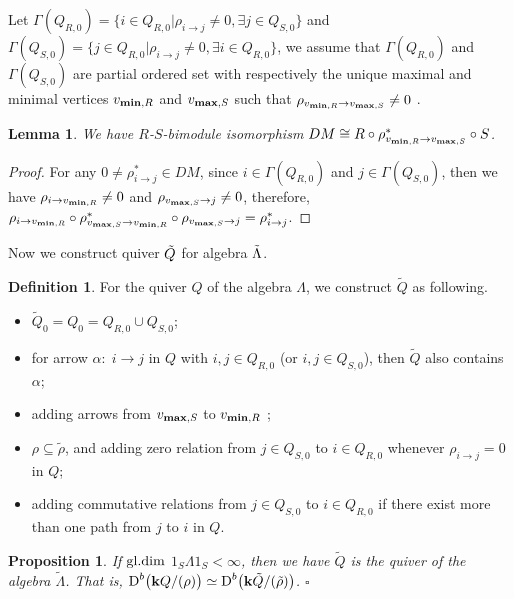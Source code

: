 \documentclass[a4paper, reqno]{amsart}
\newtheorem{lem}[thm]{Lemma}
\newtheorem{prop}[thm]{Proposition}
\theoremstyle{definition}
\newtheorem{defn}[thm]{Definition}
\theoremstyle{remark}
\numberwithin{equation}{section}
\begin{document}
 Let $\Gamma(Q_{R,0}) = \{i\in  Q_{R,0}|\rho_{i\to j}\neq 0, \exists j \in Q_{S,0}\} $ and $\Gamma(Q_{S,0}) = \{j\in  Q_{R,0}|\rho_{i\to j}\neq 0, \exists i \in Q_{R,0}\} $, we assume that $\Gamma(Q_{R,0})$ and $\Gamma(Q_{S,0})$ are partial ordered set with respectively the unique maximal and minimal vertices $ v_{{\bf min},R}$ and $ v_{{\bf max},S}$ such that $ \rho_{ v_{{\bf min},R}\to v_{{\bf max},S} }\neq 0$ . 

 \begin{lem}
     We have $R$-$S$-bimodule isomorphism $ DM \cong R\circ \rho_{ v_{{\bf min},R}\to v_{{\bf max},S} }^{*} \circ S $.
 \end{lem}

 \begin{proof}
     For any $0\neq \rho_{i\to j}^{*}\in DM$, since $i\in \Gamma(Q_{R,0})$ and $j\in \Gamma(Q_{S,0})$, then we have $ \rho_{i\to v_{{\bf min},R}} \neq 0$ and $ \rho_{ v_{{\bf max},S}\to j} \neq 0$, therefore, $ \rho_{i\to v_{{\bf min},R}} \circ \rho_{v_{{\bf max},S}\to v_{{\bf min},R}}^{*} \circ \rho_{ v_{{\bf max},S}\to j} = \rho_{i\to j}^{*} $.
 \end{proof}
 
 
 Now we construct quiver $\Tilde{Q}$ for algebra $\Tilde{\Lambda}$. 

 \begin{defn}\label{tildeQ}
For the quiver $Q$ of the algebra $\Lambda$, we construct $\tilde{Q}$ as following.
\begin{itemize}
    \item $\tilde{Q}_0=Q_0=Q_{R,0}\cup Q_{S,0}$;
    \item for arrow $\alpha:\;i\rightarrow j$ in $Q$ with $i,j\in Q_{R,0}$ (or $i,j\in Q_{S,0}$), then $\tilde{Q}$ also contains $\alpha$;
    \item adding arrows from $ v_{{\bf max},S}$ to $v_{{\bf min},R}$ ;
    \item $\rho\subseteq \tilde{\rho}$, and adding zero relation from $j\in Q_{S,0}$ to $i\in Q_{R,0}$ whenever $\rho_{i\to j} =0$ in $Q$;
    \item adding commutative relations from $j\in Q_{S,0}$ to $i\in Q_{R,0}$ if there exist more than one path from $j$ to $i$ in $Q$.
\end{itemize}
\end{defn}

\begin{prop}\label{DerInQ}
If  $\rm{gl.dim}$ $1_S \Lambda 1_S < \infty$, then we have $\tilde{Q}$ is the quiver of the algebra $\tilde{\Lambda}$. That is, $\textup{D}^b\big({\bf k} Q/(\rho)\big)\simeq \textup{D}^b\big({\bf k} \tilde{Q}/(\tilde{\rho})\big)$.  
\hfill $\square$
\end{prop}
\end{document}
